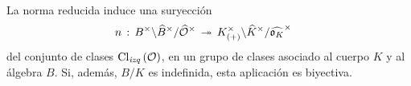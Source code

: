 \begin{teoEichlerNormaClases}[Eichler]\label{thm:eichlernormaclases}
	La norma reducida induce una suryecci\'{o}n
	\begin{align*}
		n & \,:\, B^{\times}\backslash \widehat{B}^{\times}/\widehat{\mathcal{O}}^{\times}
			\,\twoheadrightarrow\,
			K_{(+)}^{\times}\backslash\widehat{K}^{\times}/\widehat{\mathfrak{o}_{K}}^{\times}
	\end{align*}
	del conjunto de clases $\mathrm{Cl}_{\mathit{izq}}\left(\mathcal{O}\right)$, en un grupo de clases
	asociado al cuerpo $K$ y al \'{a}lgebra $B$. Si, adem\'{a}s, $B/K$ es
	indefinida, esta aplicaci\'{o}n es biyectiva.
\end{teoEichlerNormaClases}
%
